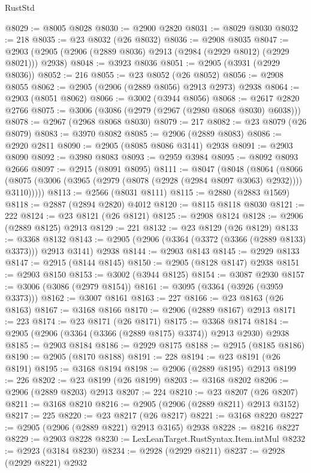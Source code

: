 \begin{lexlean}{RustStd}
\begin{coremodule}
@8029 := @8005 @8028
@8030 := @2900 @2820
@8031 := @8029 @8030
@8032 := 218
@8035 := @23 @8032 (@26 @8032)
@8036 := @2908 @8035
@8047 := @2903 (@2905 (@2906 (@2889 @8036) @2913 (@2984 (@2929 @8012) (@2929 @8021))) @2938)
@8048 := @3923 @8036
@8051 := @2905 (@3931 (@2929 @8036))
@8052 := 216
@8055 := @23 @8052 (@26 @8052)
@8056 := @2908 @8055
@8062 := @2905 (@2906 (@2889 @8056) @2913 @2973) @2938
@8064 := @2903 (@8051 @8062)
@8066 := @3002 (@3944 @8056)
@8068 := @2617 @2820 @2766
@8075 := @3006 (@3086 (@2979 (@2967 (@2980 @8068 @8030) @6038)))
@8078 := @2967 (@2968 @8068 @8030)
@8079 := 217
@8082 := @23 @8079 (@26 @8079)
@8083 := @3970 @8082
@8085 := @2906 (@2889 @8083)
@8086 := @2920 @2811
@8090 := @2905 (@8085 @8086 @3141) @2938
@8091 := @2903 @8090
@8092 := @3980 @8083
@8093 := @2959 @3984
@8095 := @8092 @8093 @2666
@8097 := @2915 (@8091 @8095)
@8111 := @8047
    (@8048
      (@8064
        (@8066 (@8075 (@3006 (@3965 (@2979 (@8078 (@2928 (@2984 @8097 @3063) @2932)))) @3110)))))
@8113 := @2566 (@8031 @8111)
@8115 := @2880 (@2883 @1569)
@8118 := @2887 (@2894 @2820) @4012
@8120 := @8115 @8118 @8030
@8121 := 222
@8124 := @23 @8121 (@26 @8121)
@8125 := @2908 @8124
@8128 := @2906 (@2889 @8125) @2913
@8129 := 221
@8132 := @23 @8129 (@26 @8129)
@8133 := @3368 @8132
@8143 := @2905 (@2906 (@3364 (@3372 (@3366 (@2889 @8133) @3373))) @2913 @3141) @2938
@8144 := @2903 @8143
@8145 := @2929 @8133
@8147 := @2915 (@8144 @8145)
@8150 := @2905 (@8128 @8147) @2938
@8151 := @2903 @8150
@8153 := @3002 (@3944 @8125)
@8154 := @3087 @2930
@8157 := @3006 (@3086 (@2979 @8154))
@8161 := @3095 (@3364 (@3926 (@3959 @3373)))
@8162 := @3007 @8161
@8163 := 227
@8166 := @23 @8163 (@26 @8163)
@8167 := @3168 @8166
@8170 := @2906 (@2889 @8167) @2913
@8171 := 223
@8174 := @23 @8171 (@26 @8171)
@8175 := @3368 @8174
@8184 := @2905 (@2906 (@3364 (@3366 (@2889 @8175) @3374)) @2913 @2930) @2938
@8185 := @2903 @8184
@8186 := @2929 @8175
@8188 := @2915 (@8185 @8186)
@8190 := @2905 (@8170 @8188)
@8191 := 228
@8194 := @23 @8191 (@26 @8191)
@8195 := @3168 @8194
@8198 := @2906 (@2889 @8195) @2913
@8199 := 226
@8202 := @23 @8199 (@26 @8199)
@8203 := @3168 @8202
@8206 := @2906 (@2889 @8203) @2913
@8207 := 224
@8210 := @23 @8207 (@26 @8207)
@8211 := @3168 @8210
@8216 := @2905 (@2906 (@2889 @8211) @2913 @3152)
@8217 := 225
@8220 := @23 @8217 (@26 @8217)
@8221 := @3168 @8220
@8227 := @2905 (@2906 (@2889 @8221) @2913 @3165) @2938
@8228 := @8216 @8227
@8229 := @2903 @8228
@8230 := LexLeanTarget.RustSyntax.Item.intMul
@8232 := @2923 (@3184 @8230)
@8234 := @2928 (@2929 @8211)
@8237 := @2928 (@2929 @8221) @2932

\end{coremodule}
\end{lexlean}
